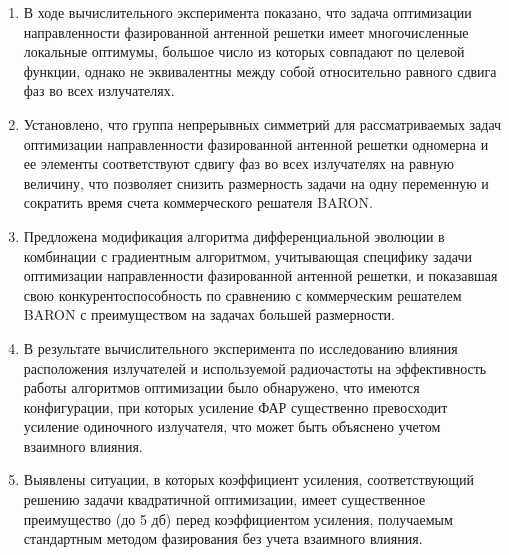 \begin{enumerate}
  \item В ходе вычислительного эксперимента показано, что задача оптимизации направленности фазированной антенной решетки имеет многочисленные локальные оптимумы, большое число из которых совпадают по целевой функции, однако не эквивалентны между собой относительно равного сдвига фаз во всех излучателях.
  \item Установлено, что группа непрерывных симметрий для рассматриваемых задач оптимизации направленности фазированной антенной решетки одномерна и ее элементы соответствуют сдвигу фаз во всех излучателях на равную величину, что позволяет снизить размерность задачи на одну переменную и сократить время счета коммерческого решателя BARON.
 \item Предложена модификация алгоритма дифференциальной эволюции в комбинации с градиентным алгоритмом, учитывающая специфику задачи оптимизации направленности фазированной антенной решетки, и показавшая свою конкурентоспособность по сравнению с коммерческим решателем BARON с преимуществом на задачах большей размерности.
  \item В результате вычислительного эксперимента по исследованию влияния расположения излучателей и используемой радиочастоты на эффективность работы алгоритмов оптимизации было обнаружено, что имеются конфигурации, при которых усиление ФАР существенно превосходит усиление одиночного излучателя, что может быть объяснено учетом взаимного влияния.
  \item Выявлены ситуации, в которых коэффициент усиления, соответствующий решению задачи квадратичной оптимизации, имеет существенное преимущество (до 5 дб) перед коэффициентом усиления, получаемым стандартным методом фазирования без учета взаимного влияния.
\end{enumerate}
